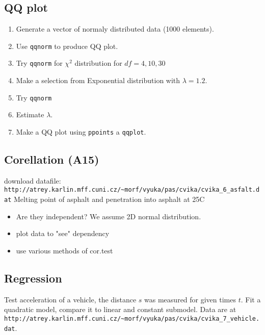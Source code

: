 \documentclass[4pt]{article}
\begin{document}
\subsection{QQ plot}
\begin{enumerate}
 \item Generate a vector of normaly distributed data (1000 elements).
 \item Use \verb'qqnorm' to produce QQ plot.
 \item Try \verb'qqnorm' for $\chi^2$ distribution for $df=4,10,30$
 \item Make a selection from Exponential distribution with $\lambda=1.2$.
 \item Try \verb'qqnorm' 
 \item Estimate $\lambda$.
 \item Make a QQ plot using \verb'ppoints' a \verb'qqplot'.
\end{enumerate}

\subsection{Corellation (A15)}
download datafile: \verb'http://atrey.karlin.mff.cuni.cz/~morf/vyuka/pas/cvika/cvika_6_asfalt.dat'
Melting point of asphalt and penetration into asphalt at 25\textdegree C

\begin{itemize}
 \item Are they independent? We assume 2D normal distribution.

 \item plot data to "see" dependency
 \item use various methods of cor.test
\end{itemize}

\subsection{Regression}
Test acceleration of a vehicle, the distance $s$ was measured for given times $t$. 
Fit a quadratic model, compare it to linear and constant submodel.
Data are at \verb'http://atrey.karlin.mff.cuni.cz/~morf/vyuka/pas/cvika/cvika_7_vehicle.dat'.


%
%  
%
%
%
%
%
%
%
\end{document}
